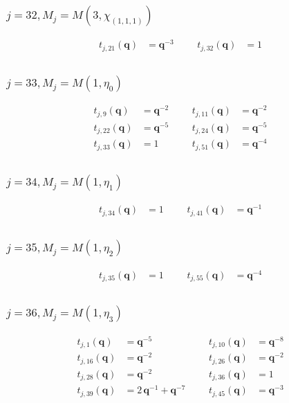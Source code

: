 \subsubsection{$j=32, M_{j}=M(3,\chi_{(1,1,1)})$}
\begin{align*}
t_{j,21}(\boldsymbol{q})&=\boldsymbol{q}^{-3} &&& t_{j,32}(\boldsymbol{q})&=1 \\
\end{align*}

\subsubsection{$j=33, M_{j}=M(1,\eta_{0})$}
\begin{align*}
t_{j,9}(\boldsymbol{q})&=\boldsymbol{q}^{-2} &&& t_{j,11}(\boldsymbol{q})&=\boldsymbol{q}^{-2} \\
t_{j,22}(\boldsymbol{q})&=\boldsymbol{q}^{-5} &&& t_{j,24}(\boldsymbol{q})&=\boldsymbol{q}^{-5} \\
t_{j,33}(\boldsymbol{q})&=1 &&& t_{j,51}(\boldsymbol{q})&=\boldsymbol{q}^{-4} \\
\end{align*}

\subsubsection{$j=34, M_{j}=M(1,\eta_{1})$}
\begin{align*}
t_{j,34}(\boldsymbol{q})&=1 &&& t_{j,41}(\boldsymbol{q})&=\boldsymbol{q}^{-1} \\
\end{align*}

\subsubsection{$j=35, M_{j}=M(1,\eta_{2})$}
\begin{align*}
t_{j,35}(\boldsymbol{q})&=1 &&& t_{j,55}(\boldsymbol{q})&=\boldsymbol{q}^{-4} \\
\end{align*}

\subsubsection{$j=36, M_{j}=M(1,\eta_{3})$}
\begin{align*}
t_{j,1}(\boldsymbol{q})&=\boldsymbol{q}^{-5} &&& t_{j,10}(\boldsymbol{q})&=\boldsymbol{q}^{-8} \\
t_{j,16}(\boldsymbol{q})&=\boldsymbol{q}^{-2} &&& t_{j,26}(\boldsymbol{q})&=\boldsymbol{q}^{-2} \\
t_{j,28}(\boldsymbol{q})&=\boldsymbol{q}^{-2} &&& t_{j,36}(\boldsymbol{q})&=1 \\
t_{j,39}(\boldsymbol{q})&=2\,\boldsymbol{q}^{-1} + \boldsymbol{q}^{-7} &&& t_{j,45}(\boldsymbol{q})&=\boldsymbol{q}^{-3} \\
\end{align*}

